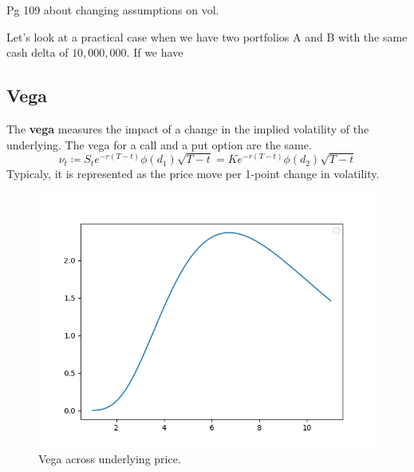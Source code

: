 \documentclass{article}
\begin{document}
    \begin{question}[Natenberg]
      Pg 109 about changing assumptions on vol. 
    \end{question}

    \begin{example}
      Let's look at a practical case when we have two portfolios A and B with the same cash delta of $10,000,000$. If we have 
    \end{example}

  \subsection{Vega}

    \begin{definition}[Vega]
      The \textbf{vega} measures the impact of a change in the implied volatility of the underlying. The vega for a call and a put option are the same. 
      \begin{equation}
        \nu_t \coloneqq S_t e^{-r (T - t)} \phi(d_1) \sqrt{T - t} = K e^{-r (T - t)} \phi(d_2) \sqrt{T - t}
      \end{equation}
      Typicaly, it is represented as the price move per 1-point change in volatility. 
      \begin{figure}[H]
        \centering 
        \includegraphics[scale=0.4]{img/vega.png}
        \caption{Vega across underlying price. } 
        \label{fig:vega}
      \end{figure}
    \end{definition}
\end{document}
